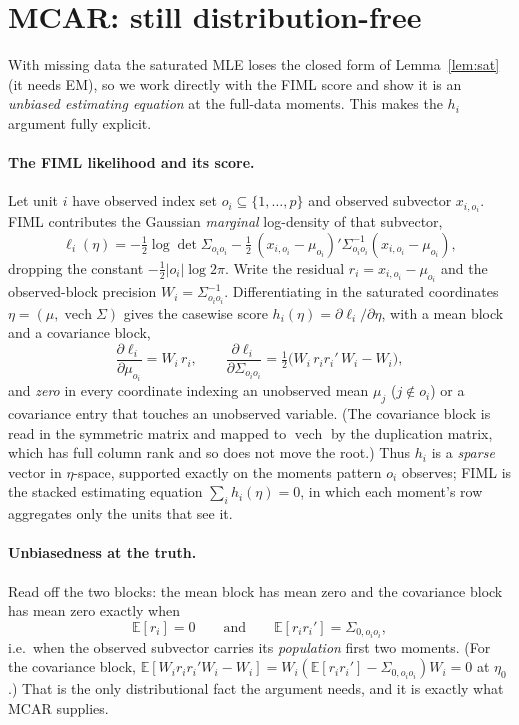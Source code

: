 \documentclass[11pt]{article}
\newcommand{\E}{\mathbb{E}}
\newcommand{\vech}{\operatorname{vech}}
\theoremstyle{plain}
\theoremstyle{remark}
\begin{document}
\section{MCAR: still distribution-free}

With missing data the saturated MLE loses the closed form of
Lemma~\ref{lem:sat} (it needs EM), so we work directly with the FIML score and
show it is an \emph{unbiased estimating equation} at the full-data moments. This
makes the $h_i$ argument fully explicit.

\paragraph{The FIML likelihood and its score.}
Let unit $i$ have observed index set $o_i\subseteq\{1,\dots,p\}$ and observed
subvector $x_{i,o_i}$. FIML contributes the Gaussian \emph{marginal} log-density
of that subvector,
\[
  \ell_i(\eta)
   = -\tfrac12\log\det\Sigma_{o_io_i}
     -\tfrac12\,(x_{i,o_i}-\mu_{o_i})'\Sigma_{o_io_i}^{-1}(x_{i,o_i}-\mu_{o_i}),
\]
dropping the constant $-\tfrac12|o_i|\log2\pi$. Write the residual
$r_i=x_{i,o_i}-\mu_{o_i}$ and the observed-block precision
$W_i=\Sigma_{o_io_i}^{-1}$. Differentiating in the saturated coordinates
$\eta=(\mu,\vech\Sigma)$ gives the casewise score
$h_i(\eta)=\partial\ell_i/\partial\eta$, with a mean block and a covariance
block,
\[
  \frac{\partial\ell_i}{\partial\mu_{o_i}} = W_i\,r_i,
  \qquad
  \frac{\partial\ell_i}{\partial\Sigma_{o_io_i}}
    = \tfrac12\big(W_i\,r_i r_i'\,W_i - W_i\big),
\]
and \emph{zero} in every coordinate indexing an unobserved mean $\mu_j$
($j\notin o_i$) or a covariance entry that touches an unobserved variable. (The
covariance block is read in the symmetric matrix and mapped to $\vech$ by the
duplication matrix, which has full column rank and so does not move the root.)
Thus $h_i$ is a \emph{sparse} vector in $\eta$-space, supported exactly on the
moments pattern $o_i$ observes; FIML is the stacked estimating equation
$\sum_i h_i(\eta)=0$, in which each moment's row aggregates only the units that
see it.

\paragraph{Unbiasedness at the truth.}
Read off the two blocks: the mean block has mean zero and the covariance block
has mean zero exactly when
\[
  \E[r_i]=0
  \qquad\text{and}\qquad
  \E[r_i r_i'] = \Sigma_{0,o_io_i},
\]
i.e.\ when the observed subvector carries its \emph{population} first two
moments. (For the covariance block, $\E[W_i r_i r_i' W_i - W_i]
= W_i(\E[r_i r_i'] - \Sigma_{0,o_io_i})W_i = 0$ at $\eta_0$.) That is the only
distributional fact the argument needs, and it is exactly what MCAR supplies.
\end{document}
